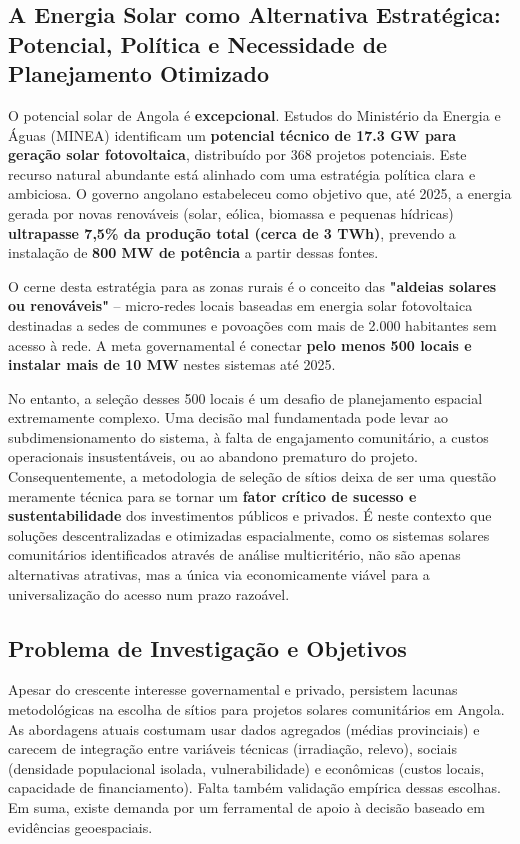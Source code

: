 \documentclass[12pt, a4paper]{article}
\begin{document}
\subsection{A Energia Solar como Alternativa Estratégica: Potencial, Política e Necessidade de Planejamento Otimizado}

O potencial solar de Angola é \textbf{excepcional}. Estudos do Ministério da Energia e Águas (MINEA) identificam um \textbf{potencial técnico de 17.3 GW para geração solar fotovoltaica}, distribuído por 368 projetos potenciais. Este recurso natural abundante está alinhado com uma estratégia política clara e ambiciosa. O governo angolano estabeleceu como objetivo que, até 2025, a energia gerada por novas renováveis (solar, eólica, biomassa e pequenas hídricas) \textbf{ultrapasse 7,5\% da produção total (cerca de 3 TWh)}, prevendo a instalação de \textbf{800 MW de potência} a partir dessas fontes.

O cerne desta estratégia para as zonas rurais é o conceito das \textbf{"aldeias solares ou renováveis"} – micro-redes locais baseadas em energia solar fotovoltaica destinadas a sedes de communes e povoações com mais de 2.000 habitantes sem acesso à rede. A meta governamental é conectar \textbf{pelo menos 500 locais e instalar mais de 10 MW} nestes sistemas até 2025. 

No entanto, a seleção desses 500 locais é um desafio de planejamento espacial extremamente complexo. Uma decisão mal fundamentada pode levar ao subdimensionamento do sistema, à falta de engajamento comunitário, a custos operacionais insustentáveis, ou ao abandono prematuro do projeto. Consequentemente, a metodologia de seleção de sítios deixa de ser uma questão meramente técnica para se tornar um \textbf{fator crítico de sucesso e sustentabilidade} dos investimentos públicos e privados. É neste contexto que soluções descentralizadas e otimizadas espacialmente, como os sistemas solares comunitários identificados através de análise multicritério, não são apenas alternativas atrativas, mas a única via economicamente viável para a universalização do acesso num prazo razoável.

\subsection{Problema de Investigação e Objetivos}

Apesar do crescente interesse governamental e privado, persistem lacunas metodológicas na escolha de sítios para projetos solares comunitários em Angola. As abordagens atuais costumam usar dados agregados (médias provinciais) e carecem de integração entre variáveis técnicas (irradiação, relevo), sociais (densidade populacional isolada, vulnerabilidade) e econômicas (custos locais, capacidade de financiamento). Falta também validação empírica dessas escolhas. Em suma, existe demanda por um ferramental de apoio à decisão baseado em evidências geoespaciais.
\end{document}
